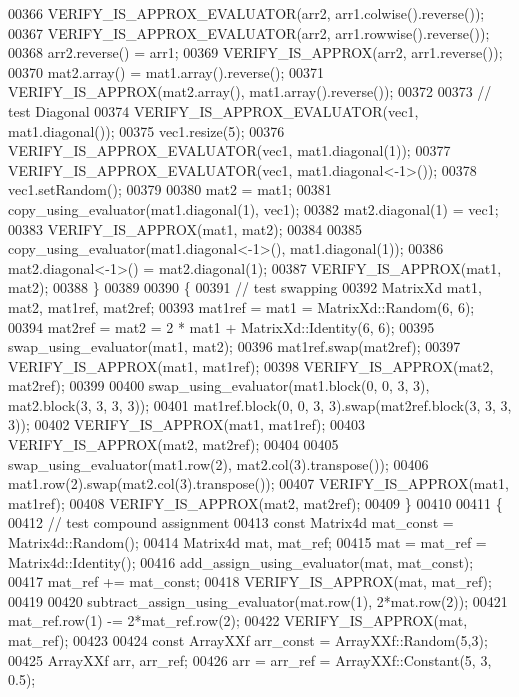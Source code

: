 \begin{DoxyCode}
00366     VERIFY\_IS\_APPROX\_EVALUATOR(arr2, arr1.colwise().reverse());
00367     VERIFY\_IS\_APPROX\_EVALUATOR(arr2, arr1.rowwise().reverse());
00368     arr2.reverse() = arr1;
00369     VERIFY\_IS\_APPROX(arr2, arr1.reverse());
00370     mat2.array() = mat1.array().reverse();
00371     VERIFY\_IS\_APPROX(mat2.array(), mat1.array().reverse());
00372 
00373     \textcolor{comment}{// test Diagonal}
00374     VERIFY\_IS\_APPROX\_EVALUATOR(vec1, mat1.diagonal());
00375     vec1.resize(5);
00376     VERIFY\_IS\_APPROX\_EVALUATOR(vec1, mat1.diagonal(1));
00377     VERIFY\_IS\_APPROX\_EVALUATOR(vec1, mat1.diagonal<-1>());
00378     vec1.setRandom();
00379 
00380     mat2 = mat1;
00381     copy\_using\_evaluator(mat1.diagonal(1), vec1);
00382     mat2.diagonal(1) = vec1;
00383     VERIFY\_IS\_APPROX(mat1, mat2);
00384 
00385     copy\_using\_evaluator(mat1.diagonal<-1>(), mat1.diagonal(1));
00386     mat2.diagonal<-1>() = mat2.diagonal(1);
00387     VERIFY\_IS\_APPROX(mat1, mat2);
00388   \}
00389   
00390   \{
00391     \textcolor{comment}{// test swapping}
00392     MatrixXd mat1, mat2, mat1ref, mat2ref;
00393     mat1ref = mat1 = MatrixXd::Random(6, 6);
00394     mat2ref = mat2 = 2 * mat1 + MatrixXd::Identity(6, 6);
00395     swap\_using\_evaluator(mat1, mat2);
00396     mat1ref.swap(mat2ref);
00397     VERIFY\_IS\_APPROX(mat1, mat1ref);
00398     VERIFY\_IS\_APPROX(mat2, mat2ref);
00399 
00400     swap\_using\_evaluator(mat1.block(0, 0, 3, 3), mat2.block(3, 3, 3, 3));
00401     mat1ref.block(0, 0, 3, 3).swap(mat2ref.block(3, 3, 3, 3));
00402     VERIFY\_IS\_APPROX(mat1, mat1ref);
00403     VERIFY\_IS\_APPROX(mat2, mat2ref);
00404 
00405     swap\_using\_evaluator(mat1.row(2), mat2.col(3).transpose());
00406     mat1.row(2).swap(mat2.col(3).transpose());
00407     VERIFY\_IS\_APPROX(mat1, mat1ref);
00408     VERIFY\_IS\_APPROX(mat2, mat2ref);
00409   \}
00410 
00411   \{
00412     \textcolor{comment}{// test compound assignment}
00413     \textcolor{keyword}{const} Matrix4d mat\_const = Matrix4d::Random(); 
00414     Matrix4d mat, mat\_ref;
00415     mat = mat\_ref = Matrix4d::Identity();
00416     add\_assign\_using\_evaluator(mat, mat\_const);
00417     mat\_ref += mat\_const;
00418     VERIFY\_IS\_APPROX(mat, mat\_ref);
00419 
00420     subtract\_assign\_using\_evaluator(mat.row(1), 2*mat.row(2));
00421     mat\_ref.row(1) -= 2*mat\_ref.row(2);
00422     VERIFY\_IS\_APPROX(mat, mat\_ref);
00423 
00424     \textcolor{keyword}{const} ArrayXXf arr\_const = ArrayXXf::Random(5,3); 
00425     ArrayXXf arr, arr\_ref;
00426     arr = arr\_ref = ArrayXXf::Constant(5, 3, 0.5);

\end{DoxyCode}
